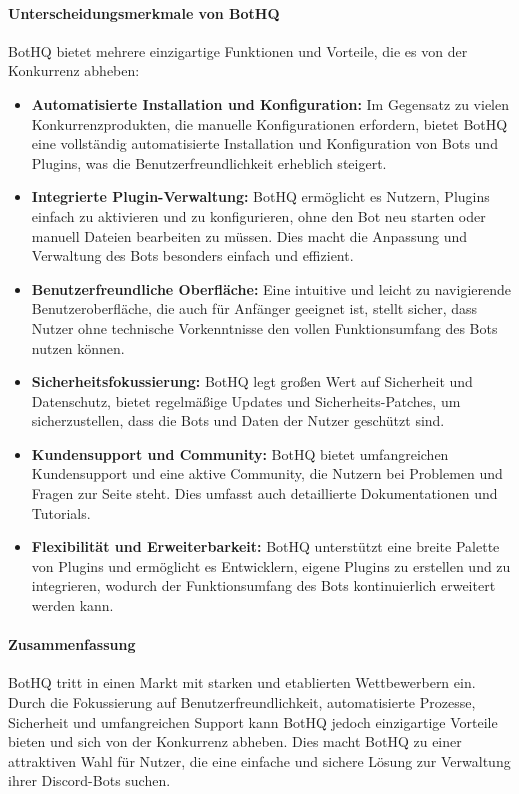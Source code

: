 \paragraph{Unterscheidungsmerkmale von BotHQ}
BotHQ bietet mehrere einzigartige Funktionen und Vorteile, die es von der Konkurrenz abheben:

\begin{itemize}
  \item \textbf{Automatisierte Installation und Konfiguration:} Im Gegensatz zu vielen Konkurrenzprodukten, die manuelle Konfigurationen erfordern, bietet BotHQ eine vollständig automatisierte Installation und Konfiguration von Bots und Plugins, was die Benutzerfreundlichkeit erheblich steigert.

  \item \textbf{Integrierte Plugin-Verwaltung:} BotHQ ermöglicht es Nutzern, Plugins einfach zu aktivieren und zu konfigurieren, ohne den Bot neu starten oder manuell Dateien bearbeiten zu müssen. Dies macht die Anpassung und Verwaltung des Bots besonders einfach und effizient.

  \item \textbf{Benutzerfreundliche Oberfläche:} Eine intuitive und leicht zu navigierende Benutzeroberfläche, die auch für Anfänger geeignet ist, stellt sicher, dass Nutzer ohne technische Vorkenntnisse den vollen Funktionsumfang des Bots nutzen können.

  \item \textbf{Sicherheitsfokussierung:} BotHQ legt großen Wert auf Sicherheit und Datenschutz, bietet regelmäßige Updates und Sicherheits-Patches, um sicherzustellen, dass die Bots und Daten der Nutzer geschützt sind.

  \item \textbf{Kundensupport und Community:} BotHQ bietet umfangreichen Kundensupport und eine aktive Community, die Nutzern bei Problemen und Fragen zur Seite steht. Dies umfasst auch detaillierte Dokumentationen und Tutorials.

  \item \textbf{Flexibilität und Erweiterbarkeit:} BotHQ unterstützt eine breite Palette von Plugins und ermöglicht es Entwicklern, eigene Plugins zu erstellen und zu integrieren, wodurch der Funktionsumfang des Bots kontinuierlich erweitert werden kann.
\end{itemize}

\paragraph{Zusammenfassung}
BotHQ tritt in einen Markt mit starken und etablierten Wettbewerbern ein. Durch die Fokussierung auf Benutzerfreundlichkeit, automatisierte Prozesse, Sicherheit und umfangreichen Support kann BotHQ jedoch einzigartige Vorteile bieten und sich von der Konkurrenz abheben. Dies macht BotHQ zu einer attraktiven Wahl für Nutzer, die eine einfache und sichere Lösung zur Verwaltung ihrer Discord-Bots suchen.


